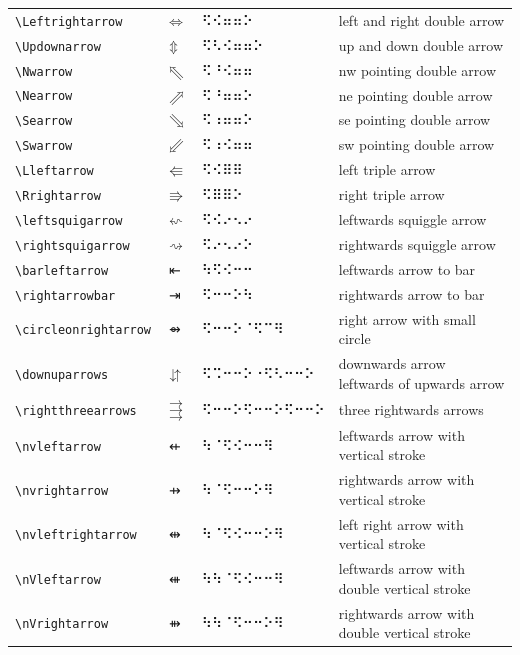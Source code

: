 \documentclass[oneside]{article}
\begin{document}
\begin{longtable}{llll}
\verb|\Leftrightarrow| & $\Leftrightarrow$ &   ⠫⠪⠶⠶⠕   & {left and right double arrow} \\[2ex]
\verb|\Updownarrow| & $\Updownarrow$ &   ⠫⠣⠪⠶⠶⠕   & {up and down double arrow} \\[2ex]
\verb|\Nwarrow| & $\Nwarrow$ &   ⠫⠘⠪⠶⠶   & {nw pointing double arrow} \\[2ex]
\verb|\Nearrow| & $\Nearrow$ &   ⠫⠘⠶⠶⠕   & {ne pointing double arrow} \\[2ex]
\verb|\Searrow| & $\Searrow$ &   ⠫⠰⠶⠶⠕   & {se pointing double arrow} \\[2ex]
\verb|\Swarrow| & $\Swarrow$ &   ⠫⠰⠪⠶⠶   & {sw pointing double arrow} \\[2ex]
\verb|\Lleftarrow| & $\Lleftarrow$ &   ⠫⠪⠿⠿   & {left triple arrow} \\[2ex]
\verb|\Rrightarrow| & $\Rrightarrow$ &   ⠫⠿⠿⠕   & {right triple arrow} \\[2ex]
\verb|\leftsquigarrow| & $\leftsquigarrow$ &   ⠫⠪⠔⠢⠔   & {leftwards squiggle arrow} \\[2ex]
\verb|\rightsquigarrow| & $\rightsquigarrow$ &   ⠫⠔⠢⠔⠕   & {rightwards squiggle arrow} \\[2ex]
\verb|\barleftarrow| & $\barleftarrow$ &   ⠳⠫⠪⠒⠒   & {leftwards arrow to bar} \\[2ex]
\verb|\rightarrowbar| & $\rightarrowbar$ &   ⠫⠒⠒⠕⠳   & {rightwards arrow to bar} \\[2ex]
\verb|\circleonrightarrow| & $\circleonrightarrow$ &   ⠫⠒⠒⠕⠈⠫⠉⠻   & {right arrow with small circle} \\[2ex]
\verb|\downuparrows| & $\downuparrows$ &   ⠫⠩⠒⠒⠕⠐⠫⠣⠒⠒⠕   & {downwards arrow leftwards of upwards arrow} \\[2ex]
\verb|\rightthreearrows| & $\rightthreearrows$ &   ⠫⠒⠒⠕⠫⠒⠒⠕⠫⠒⠒⠕   & {three rightwards arrows} \\[2ex]
\verb|\nvleftarrow| & $\nvleftarrow$ &   ⠳⠈⠫⠪⠒⠒⠻   & {leftwards arrow with vertical stroke} \\[2ex]
\verb|\nvrightarrow| & $\nvrightarrow$ &   ⠳⠈⠫⠒⠒⠕⠻   & {rightwards arrow with vertical stroke} \\[2ex]
\verb|\nvleftrightarrow| & $\nvleftrightarrow$ &   ⠳⠈⠫⠪⠒⠒⠕⠻   & {left right arrow with vertical stroke} \\[2ex]
\verb|\nVleftarrow| & $\nVleftarrow$ &   ⠳⠳⠈⠫⠪⠒⠒⠻   & {leftwards arrow with double vertical stroke} \\[2ex]
\verb|\nVrightarrow| & $\nVrightarrow$ &   ⠳⠳⠈⠫⠒⠒⠕⠻   & {rightwards arrow with double vertical stroke} \\[2ex]

\end{longtable}
\end{document}
